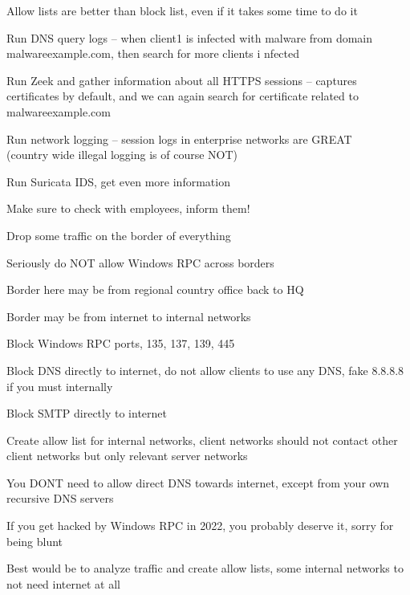 \documentclass[Screen16to9,17pt]{foils}
\begin{document}
Allow lists are better than block list, even if it takes some time to do it



\begin{list2}
\item Run DNS query logs -- when client1 is infected with malware from domain malwareexample.com, then search for more clients i
nfected
\item Run Zeek and gather information about all HTTPS sessions -- captures certificates by default, and we can again search for
certificate related to malwareexample.com
\item Run network logging -- session logs in enterprise networks are GREAT \\
(country wide illegal logging is of course NOT)
\item Run Suricata IDS, get even more information
\end{list2}

Make sure to check with employees, inform them!


\begin{list2}
\item Drop some traffic on the border of everything
\item Seriously do NOT allow Windows RPC across borders
\item Border here may be from regional country office back to HQ
\item Border may be from internet to internal networks
\item Block Windows RPC ports, 135, 137, 139, 445
\item Block DNS directly to internet, do not allow clients to use any DNS, fake 8.8.8.8 if you must internally
\item Block SMTP directly to internet
\item Create allow list for internal networks, client networks should not contact other client networks but only relevant server networks
\end{list2}

You DONT need to allow direct DNS towards internet, except from your own recursive DNS servers

If you get hacked by Windows RPC in 2022, you probably deserve it, sorry for being blunt

Best would be to analyze traffic and create allow lists, some internal networks to not need internet at all
\end{document}
